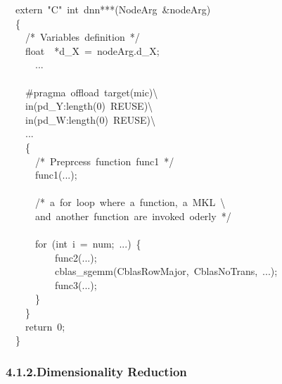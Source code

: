 \documentclass{article}
\begin{document}
\begin{mdpre}%
\noindent~~extern~{"}{C}{"}~{int}~dnn***({NodeArg}~\&nodeArg)\\
~~\{\\
~~~~{/*}{~Variables~definition~}{*/}\\
~~~~{float}~~*d\_X~=~nodeArg.d\_X;\\
~~~~~~...\\
~~~~\\
~~~~\#pragma~offload~target(mic)\textbackslash{}\\
~~~~in(pd\_Y:length({0})~{REUSE})\textbackslash{}\\
~~~~in(pd\_W:length({0})~{REUSE})\textbackslash{}\\
~~~~...\\
~~~~\{\\
~~~~~~{/*}{~Preprcess~function~func1~}{*/}\\
~~~~~~func1(...);\\
\\
~~~~~~{/*}{~a~for~loop~where~a~function,~a~MKL~\textbackslash{}}\\
{~~~~~~and~another~function~are~invoked~oderly~}{*/}\\
\\
~~~~~~{for}~({int}~i~=~num;~...)~\{\\
~~~~~~~~~~func2(...);\\
~~~~~~~~~~cblas\_sgemm({CblasRowMajor},~{CblasNoTrans},~...);\\
~~~~~~~~~~func3(...);\\
~~~~~~\}\\
~~~~\}~\\
~~~~{return}~{0};\\
~~\}\\
\end{mdpre}
\subsubsection{4.1.2.\hspace*{0.5em}Dimensionality Reduction}\label{sec-dimensionality-reduction}%
\end{document}
